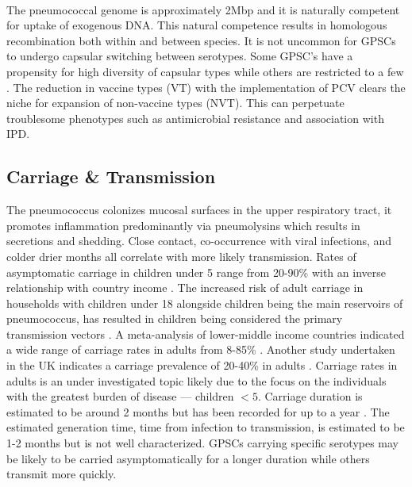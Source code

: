\documentclass{article}
\begin{document}
\\The pneumococcal genome is approximately 2Mbp and it is naturally competent for uptake of exogenous DNA. This natural competence results in homologous recombination both within and between species. It is not uncommon for GPSCs to undergo capsular switching between serotypes. Some GPSC’s have a propensity for high diversity of capsular types while others are restricted to a few \cite{loPneumococcalLineagesAssociated2019}. The reduction in vaccine types (VT) with the implementation of PCV clears the niche for expansion of non-vaccine types (NVT). This can perpetuate troublesome phenotypes such as antimicrobial resistance and association with IPD.
\subsection{Carriage \& Transmission} 
The pneumococcus colonizes mucosal surfaces in the upper respiratory tract, it promotes inflammation predominantly via pneumolysins which results in secretions and shedding. Close contact, co-occurrence with viral infections, and colder drier months all correlate with more likely transmission\cite{weiserStreptococcusPneumoniaeTransmission2018}. Rates of asymptomatic carriage in children under 5 range from 20-90\% with an inverse relationship with country income \cite{almeidaDynamicsPneumococcalCarriage2020,adegbolaCarriageStreptococcusPneumoniae2014}. The increased risk of adult carriage in households with children under 18 alongside children being the main reservoirs of pneumococcus, has resulted in children being considered the primary transmission vectors \cite{almeidaDynamicsPneumococcalCarriage2020,bogaertStreptococcusPneumoniaeColonisation2004}. A meta-analysis of lower-middle income countries indicated a wide range of carriage rates in adults from 8-85\% \cite{adegbolaCarriageStreptococcusPneumoniae2014}. Another study undertaken in the UK indicates a carriage prevalence of 20-40\% in adults\cite{almeidaDynamicsPneumococcalCarriage2020} . Carriage rates in adults is an under investigated topic likely due to the focus on the individuals with the greatest burden of disease --- children $<5$.  Carriage duration is estimated to be around 2 months but has been recorded for up to a year \cite{almeidaDynamicsPneumococcalCarriage2020,dubeLongitudinalCharacterizationNasopharyngeal2018}. The estimated generation time, time from infection to transmission, is estimated to be 1-2 months but is not well characterized. GPSCs carrying specific serotypes may be likely to be carried asymptomatically for a longer duration while others transmit more quickly\cite{leesGenomewideIdentificationLineage2017}.
\end{document}
